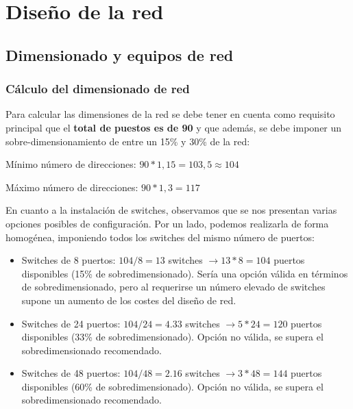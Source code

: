 \chapter{Diseño de la red}
\label{section:diseno}


\section{Dimensionado y equipos de red}

\subsection{Cálculo del dimensionado de red}
\label{sec:dim}

Para calcular las dimensiones de la red se debe tener en cuenta como requisito principal que el \textbf{total de puestos es de 90} y que además, se debe imponer un sobre-dimensionamiento de entre un 15\% y 30\%  de la red: 

\vspace{1mm}

Mínimo número de direcciones: $90*1,15 = 103,5 \approx 104$

Máximo número de direcciones: $90*1,3 = 117$ 
 
\vspace{1mm}

En cuanto a la instalación de switches, observamos que se nos presentan varias opciones posibles de configuración. Por un lado, podemos realizarla de forma homogénea, imponiendo todos los switches del mismo número de puertos:

\vspace{2mm}
 
\begin{itemize}
\item Switches de 8 puertos: $104/8 = 13$ switches $\rightarrow 13*8 = 104$ puertos disponibles (15\% de sobredimensionado). Sería una opción válida en términos de sobredimensionado, pero al requerirse un número elevado de switches supone un aumento de los costes del diseño de red. \vspace{1mm}
\item Switches de 24 puertos: $104/24 = 4.33$ switches $\rightarrow 5*24 = 120$ puertos disponibles (33\% de sobredimensionado). Opción no válida, se supera el sobredimensionado recomendado. \vspace{1mm}
\item Switches de 48 puertos: $104/48 = 2.16$ switches $\rightarrow 3*48 = 144$ puertos disponibles (60\% de sobredimensionado). Opción no válida, se supera el sobredimensionado recomendado. \vspace{1mm}
\end{itemize}

